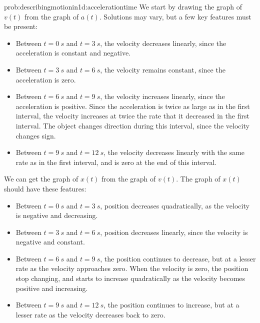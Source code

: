 \newpage
\begin{solution}{prob:describingmotionin1d:accelerationtime}\label{soln:describingmotionin1d:accelerationtime}
We start by drawing the graph of $v(t)$ from the graph of $a(t)$. Solutions may vary, but a few key features must be present:
\begin{itemize}
\item Between $t=\SI{0}{s}$ and $t=\SI{3}{s}$, the velocity decreases linearly, since the acceleration is constant and negative.
\item Between $t=\SI{3}{s}$ and $t=\SI{6}{s}$, the velocity remains constant, since the acceleration is zero.
\item Between $t=\SI{6}{s}$ and $t=\SI{9}{s}$, the velocity increases linearly, since the acceleration is positive. Since the acceleration is twice as large as in the first interval, the velocity increases at twice the rate that it decreased in the first interval. The object changes direction during this interval, since the velocity changes sign.
\item Between $t=\SI{9}{s}$ and $t=\SI{12}{s}$, the velocity decreases linearly with the same rate as in the first interval, and is zero at the end of this interval.
\end{itemize}
We can get the graph of $x(t)$ from the graph of $v(t)$. The graph of $x(t)$ should have these features:
\begin{itemize}
\item Between $t=\SI{0}{s}$ and $t=\SI{3}{s}$, position decreases quadratically, as the velocity is negative and decreasing.
\item Between $t=\SI{3}{s}$ and $t=\SI{6}{s}$, position decreases linearly, since the velocity is negative and constant.
\item Between $t=\SI{6}{s}$ and $t=\SI{9}{s}$, the position continues to decrease, but at a lesser rate as the velocity approaches zero. When the velocity is zero, the position stop changing, and starts to increase quadratically as the velocity becomes positive and increasing.
\item Between $t=\SI{9}{s}$ and $t=\SI{12}{s}$, the position continues to increase, but at a lesser rate as the velocity decreases back to zero.
\end{itemize}
\end{solution}


